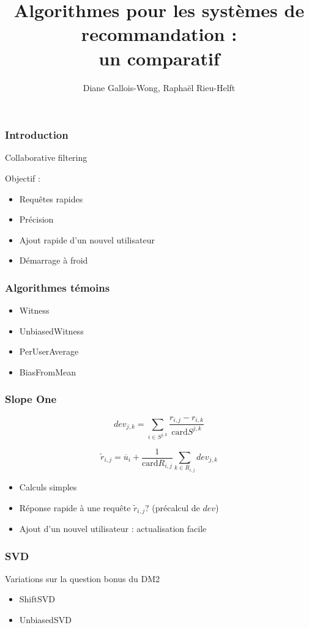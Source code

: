 \documentclass[18pt]{beamer}
\title[Filtrage collaboratif]{Algorithmes pour les systèmes de recommandation :\\ un comparatif}
\author{Diane Gallois-Wong, Raphaël Rieu-Helft}
\newcommand{\card}{\mathrm{card}}
\begin{document}
	\begin{frame}
		\titlepage
	\end{frame}
	\begin{frame}
		\frametitle{Introduction}
		Collaborative filtering
		
		\bigskip
		
		Objectif : \begin{itemize}
			\item Requêtes rapides
			\item Précision
			\item Ajout rapide d'un nouvel utilisateur
			\item Démarrage à froid
		\end{itemize}
	\end{frame}
	\begin{frame}
		\frametitle{Algorithmes témoins}
		
		\begin{itemize}
			\item Witness
			\item UnbiasedWitness
			\item PerUserAverage
			\item BiasFromMean
		\end{itemize}
	\end{frame}
	\begin{frame}
		\frametitle{Slope One}
		$$dev_{j,k} = \sum\limits_{i\in S^{j,k}}
				\frac{r_{i,j}-r_{i,k}}{\card S^{j,k}}$$
				
		$$\tilde r_{i,j} = \overline u_i + \frac{1}{\card R_{i,j}} \sum\limits_{k\in R_{i,j}} dev_{j,k}$$	
		
		
		
		\begin{itemize}
		\item
		Calculs simples
		\item
		Réponse rapide à une requête $\tilde r_{i,j}?$
		\quad (précalcul de $dev$)
		\item
		Ajout d'un nouvel utilisateur : actualisation facile
		\end{itemize}
		
	\end{frame}
	\begin{frame}
		\frametitle{SVD}
		Variations sur la question bonus du DM2
		\begin{itemize}
			\item ShiftSVD
			\item UnbiasedSVD	
		\end{itemize}
	\end{frame}
\end{document}
